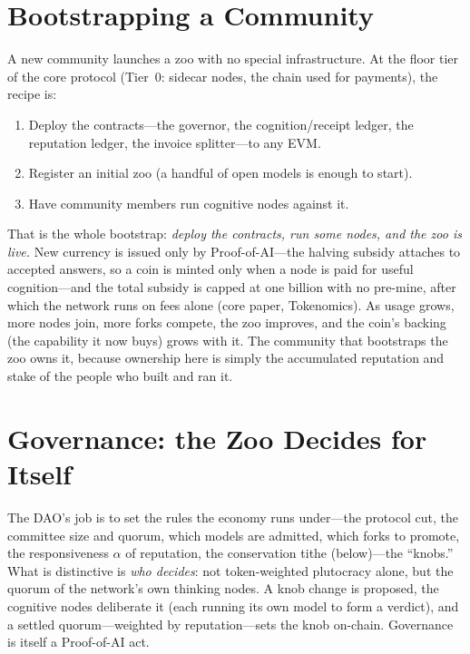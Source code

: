 \documentclass[11pt]{article}
\begin{document}
\section{Bootstrapping a Community}

A new community launches a zoo with no special infrastructure. At the floor tier of the core protocol (Tier~0: sidecar nodes, the chain used for payments), the recipe is:

\begin{enumerate}[leftmargin=1.4em]
\item Deploy the contracts---the governor, the cognition/receipt ledger, the reputation ledger, the invoice splitter---to any EVM.
\item Register an initial zoo (a handful of open models is enough to start).
\item Have community members run cognitive nodes against it.
\end{enumerate}

That is the whole bootstrap: \emph{deploy the contracts, run some nodes, and the zoo is live.} New currency is issued only by Proof-of-AI---the halving subsidy attaches to accepted answers, so a coin is minted only when a node is paid for useful cognition---and the total subsidy is capped at one billion with no pre-mine, after which the network runs on fees alone (core paper, Tokenomics). As usage grows, more nodes join, more forks compete, the zoo improves, and the coin's backing (the capability it now buys) grows with it. The community that bootstraps the zoo owns it, because ownership here is simply the accumulated reputation and stake of the people who built and ran it.

\section{Governance: the Zoo Decides for Itself}

The DAO's job is to set the rules the economy runs under---the protocol cut, the committee size and quorum, which models are admitted, which forks to promote, the responsiveness $\alpha$ of reputation, the conservation tithe (below)---the ``knobs.'' What is distinctive is \emph{who decides}: not token-weighted plutocracy alone, but the quorum of the network's own thinking nodes. A knob change is proposed, the cognitive nodes deliberate it (each running its own model to form a verdict), and a settled quorum---weighted by reputation---sets the knob on-chain. Governance is itself a Proof-of-AI act.
\end{document}

